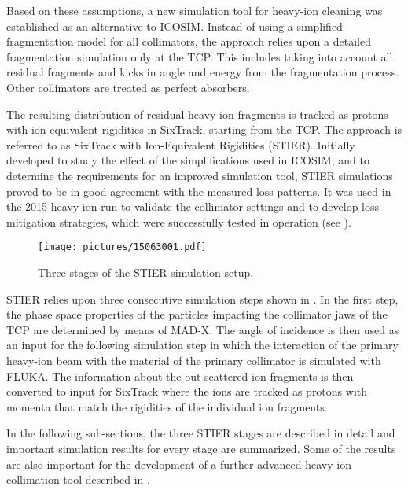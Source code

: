 Based on these assumptions, a new simulation tool for heavy-ion cleaning was established as an alternative to ICOSIM. Instead of using a simplified fragmentation model for all collimators, the approach relies upon a detailed fragmentation simulation only at the TCP. This includes taking into account all residual fragments and kicks in angle and energy from the fragmentation process. Other collimators are treated as perfect absorbers. 

The resulting distribution of residual heavy-ion fragments is tracked as protons with ion-equivalent rigidities in SixTrack, starting from the TCP. The approach is referred to as SixTrack with Ion-Equivalent Rigidities (STIER). Initially developed to study the effect of the simplifications used in ICOSIM, and to determine the requirements for an improved simulation tool, STIER simulations proved to be in good agreement with the measured loss patterns. It was used in the 2015 heavy-ion run to validate the collimator settings and to develop loss mitigation strategies, which were successfully tested in operation (see ).

%
  \begin{figure}[b]
  \centering
  \texttt{[image: pictures/15063001.pdf]}
  \caption{Three stages of the STIER simulation setup.}  
  \label{pic:15062601}
  \end{figure}
%

STIER relies upon three consecutive simulation steps shown in . In the first step, the phase space properties of the particles impacting the collimator jaws of the TCP are determined by means of MAD-X. The angle of incidence is then used as an input for the following simulation step in which the interaction of the primary heavy-ion beam with the material of the primary collimator is simulated with FLUKA. The information about the out-scattered ion fragments is then converted to input for SixTrack where the ions are tracked as protons with momenta that match the rigidities of the individual ion fragments.

In the following sub-sections, the three STIER stages are described in detail and important simulation results for every stage are summarized. Some of the results are also important for the development of a further advanced heavy-ion collimation tool described in .
%
%
